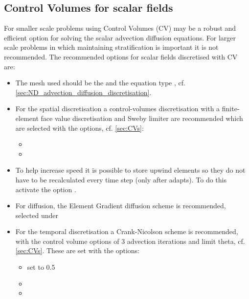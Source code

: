 \subsection{Control Volumes for scalar fields}
For smaller scale problems using Control Volumes (CV) may be a robust and efficient
option for solving the scalar advection diffusion equations. For larger scale problems in which maintaining stratification is
important it is not recommended. The recommended options for scalar fields 
discretised with CV are:
\begin{itemize}
  \item The mesh used should be the  and the equation type , cf. \ref{sec:ND_advection_diffusion_discretisation}. 
  \item For the spatial discretisation a control-volumes discretisation with a finite-element face value discretisation and Sweby limiter are recommended which are selected with the options, cf. \ref{sec:CVs}:
\begin{itemize}
\item {}
\item {}
\end{itemize}
\item To help increase speed it is possible to store upwind elements so they do
  not have to be recalculated every time step (only after adapts). To do this
  activate the option
.
\item For diffusion, the Element Gradient diffusion scheme is recommended, selected under 
\item For the temporal discretisation a Crank-Nicolson scheme is recommended, with the control volume options of 3 advection iterations and limit theta, cf. \ref{sec:CVs}. These are set with the options:
\begin{itemize}
\item{ set to 0.5}
\item{}
\item{}
\end{itemize}
\end{itemize}

